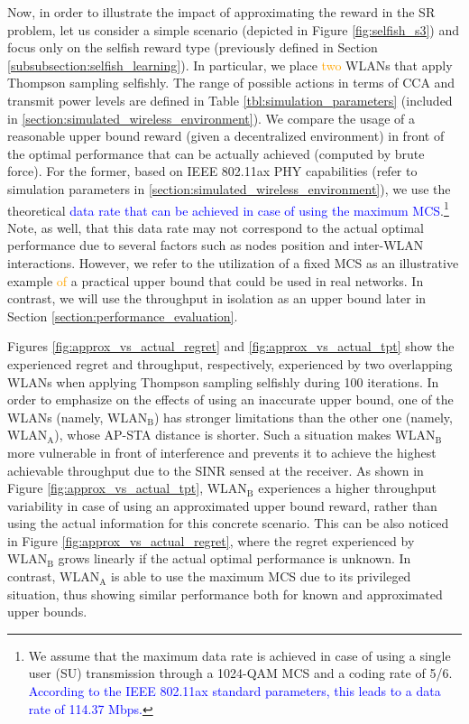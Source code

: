 \documentclass[preprint,12pt]{elsarticle}
\begin{document}
Now, in order to illustrate the impact of approximating the reward in the SR problem, let us consider a simple scenario (depicted in Figure \ref{fig:selfish_s3}) and focus only on the selfish reward type (previously defined in Section \ref{subsubsection:selfish_learning}). In particular, we place \textcolor{orange}{two} WLANs that apply Thompson sampling selfishly. The range of possible actions in terms of CCA and transmit power levels are defined in Table \ref{tbl:simulation_parameters} (included in \ref{section:simulated_wireless_environment}). We compare the usage of a reasonable upper bound reward (given a decentralized environment) in front of the optimal performance that can be actually achieved (computed by brute force). For the former, based on IEEE 802.11ax PHY capabilities (refer to simulation parameters in \ref{section:simulated_wireless_environment}), we use the theoretical \textcolor{blue}{data rate that can be achieved in case of using the maximum MCS}.\footnote{We assume that the maximum data rate is achieved in case of using a single user (SU) transmission through a 1024-QAM MCS and a coding rate of 5/6. \textcolor{blue}{According to the IEEE 802.11ax standard parameters, this leads to a data rate of 114.37 Mbps.}} Note, as well, that this data rate may not correspond to the actual optimal performance due to several factors such as nodes position and inter-WLAN interactions. However, we refer to the utilization of a fixed MCS as an illustrative example \textcolor{orange}{of} a practical upper bound that could be used in real networks. In contrast, we will use the throughput in isolation as an upper bound later in Section \ref{section:performance_evaluation}.

Figures \ref{fig:approx_vs_actual_regret} and \ref{fig:approx_vs_actual_tpt} show the experienced regret and throughput, respectively, experienced by two overlapping WLANs when applying Thompson sampling selfishly during 100 iterations. In order to emphasize on the effects of using an inaccurate upper bound, one of the WLANs (namely, $\text{WLAN}_\text{B}$) has stronger limitations than the other one (namely, $\text{WLAN}_\text{A}$), whose AP-STA distance is shorter. Such a situation makes $\text{WLAN}_\text{B}$ more vulnerable in front of interference and prevents it to achieve the highest achievable throughput due to the SINR sensed at the receiver. As shown in Figure \ref{fig:approx_vs_actual_tpt}, $\text{WLAN}_\text{B}$ experiences a higher throughput variability in case of using an approximated upper bound reward, rather than using the actual information for this concrete scenario. This can be also noticed in Figure \ref{fig:approx_vs_actual_regret}, where the regret experienced by $\text{WLAN}_\text{B}$ grows linearly if the actual optimal performance is unknown. In contrast, $\text{WLAN}_\text{A}$ is able to use the maximum MCS due to its privileged situation, thus showing similar performance both for known and approximated upper bounds.
\end{document}
